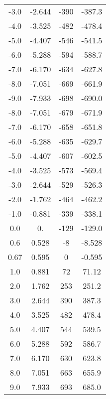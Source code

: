 \begin{table}
\begin{tabular}{S[table-format=1.2] S[table-format=1.3] S[table-format=3.0] S[table-format=3.3]}
            -3.0    & -2.644    & -390  & -387.3    \\
            -4.0    & -3.525    & -482  & -478.4    \\
            -5.0    & -4.407    & -546  & -541.5    \\
            -6.0    & -5.288    & -594  & -588.7    \\
            -7.0    & -6.170    & -634  & -627.8    \\
            -8.0    & -7.051    & -669  & -661.9    \\
            -9.0    & -7.933    & -698  & -690.0    \\
            -8.0    & -7.051    & -679  & -671.9    \\
            -7.0    & -6.170    & -658  & -651.8    \\
            -6.0    & -5.288    & -635  & -629.7    \\
            -5.0    & -4.407    & -607  & -602.5    \\
            -4.0    & -3.525    & -573  & -569.4    \\
            -3.0    & -2.644    & -529  & -526.3    \\
            -2.0    & -1.762    & -464  & -462.2    \\
            -1.0    & -0.881    & -339  & -338.1    \\
            0.0     & 0.        & -129  & -129.0    \\
            0.6     & 0.528     & -8    & -8.528    \\
            0.67    & 0.595     & 0     & -0.595   \\
            1.0     & 0.881     & 72    & 71.12     \\
            2.0     & 1.762     & 253   & 251.2     \\
            3.0     & 2.644     & 390   & 387.3     \\
            4.0     & 3.525     & 482   & 478.4     \\
            5.0     & 4.407     & 544   & 539.5     \\
            6.0     & 5.288     & 592   & 586.7     \\
            7.0     & 6.170     & 630   & 623.8     \\
            8.0     & 7.051     & 663   & 655.9     \\
            9.0     & 7.933     & 693   & 685.0     \\
            \bottomrule
        \end{tabular}
    \end{table}

